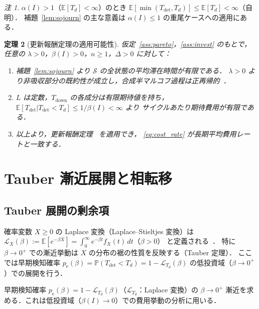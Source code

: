 \documentclass[12pt,a4paper]{article}
\theoremstyle{plain}
\newtheorem{theorem}{定理}[section]
\theoremstyle{definition}
\theoremstyle{remark}
\newtheorem{remark}[theorem]{注}
\newcommand{\E}{\mathbb{E}}
\newcommand{\Prob}{\mathbb{P}}
\newcommand{\calL}{\mathcal{L}}
\newcommand{\pe}{p_{\mathrm{e}}}
\newcommand{\Tdet}{T_{\mathrm{det}}}
\newcommand{\Tdown}{T_{\mathrm{down}}}
\newcommand{\betaI}{\beta(I)}
\newcommand{\alphI}{\alpha(I)}
\begin{document}
\begin{remark}
$\alphI>1$（$\E[T_d]<\infty$）のとき $\E[\min(\Tdet,T_d)]\le\E[T_d]<\infty$（自明）．
補題~\ref{lem:sojourn} の主な意義は $\alphI\le1$ の重尾ケースへの適用にある．
\end{remark}

\begin{theorem}[更新報酬定理の適用可能性]\label{thm:renewal}
仮定~\ref{ass:pareto}，\ref{ass:invest} のもとで，任意の $\lambda>0$，$\betaI>0$，$n\ge1$，$\Delta>0$ に対して：
\begin{enumerate}[label=(\roman*)]
\item 補題~\ref{lem:sojourn} より $\mathcal{S}$ の全状態の平均滞在時間が有限である．
  $\lambda>0$ より非吸収部分の既約性が成立し，合成半マルコフ過程は正再帰的~\cite{limnios2001,cinlar1975}．
\item $L$ は定数，$\Tdown$ の各成分は有限期待値を持ち，
  $\E[\Tdet|\Tdet<T_d]\le1/\betaI<\infty$ より
  サイクルあたり期待費用が有限である．
\item 以上より，更新報酬定理~\cite{ross2014,cox1962} を適用でき，
  \eqref{eq:cost_rate} が長期平均費用レートと一致する．
\end{enumerate}
\end{theorem}

\section{Tauber 漸近展開と相転移}
\label{sec:tauberian}

\subsection{Tauber 展開の剰余項}

\begin{tcolorbox}[mathbox, title={Laplace 変換と Tauber 定理}]
確率変数 $X\ge0$ の Laplace 変換（Laplace--Stieltjes 変換）は
$\calL_X(\beta):=\E[e^{-\beta X}]=\int_0^\infty e^{-\beta t}f_X(t)\,dt$（$\beta>0$）
と定義される~\cite{feller1971,bingham1989,asmussen2003}．
特に $\beta\to0^+$ での漸近挙動は $X$ の分布の裾の性質を反映する（Tauber 定理）．
ここでは早期検知確率
$\pe(\beta)=\Prob(\Tdet<T_d)=1-\calL_{T_d}(\beta)$
の低投資域（$\beta\to0^+$）での展開を行う．
\end{tcolorbox}

早期検知確率 $\pe(\beta)=1-\calL_{T_d}(\beta)$（$\calL_{T_d}$：Laplace 変換）の
$\beta\to0^+$ 漸近を求める．これは低投資域（$\betaI\to0$）での費用挙動の分析に用いる．
\end{document}
